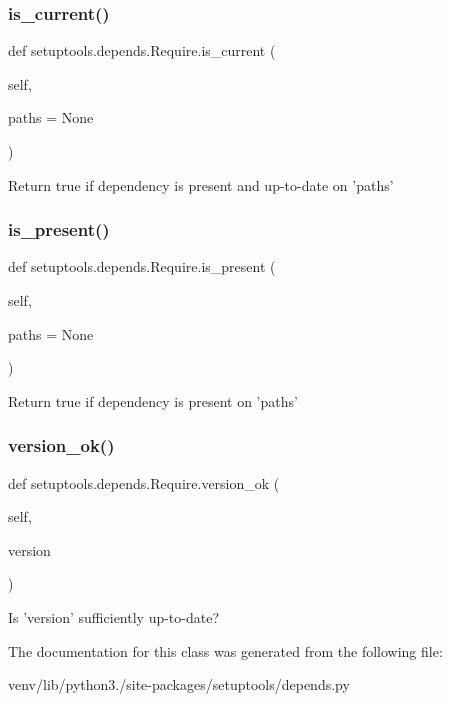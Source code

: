 \subsubsection{\texorpdfstring{is\+\_\+current()}{is\_current()}}
{\footnotesize\ttfamily def setuptools.\+depends.\+Require.\+is\+\_\+current (\begin{DoxyParamCaption}\item[{}]{self,  }\item[{}]{paths = {\ttfamily None} }\end{DoxyParamCaption})}

\begin{DoxyVerb}Return true if dependency is present and up-to-date on 'paths'\end{DoxyVerb}
 \mbox{\label{classsetuptools_1_1depends_1_1_require_a69771b02a8e6f6aee88cf1e9dfa0b6d4}} 
\subsubsection{\texorpdfstring{is\+\_\+present()}{is\_present()}}
{\footnotesize\ttfamily def setuptools.\+depends.\+Require.\+is\+\_\+present (\begin{DoxyParamCaption}\item[{}]{self,  }\item[{}]{paths = {\ttfamily None} }\end{DoxyParamCaption})}

\begin{DoxyVerb}Return true if dependency is present on 'paths'\end{DoxyVerb}
 \mbox{\label{classsetuptools_1_1depends_1_1_require_ae09a6a0a9d85091433a92026a2540e27}} 
\subsubsection{\texorpdfstring{version\+\_\+ok()}{version\_ok()}}
{\footnotesize\ttfamily def setuptools.\+depends.\+Require.\+version\+\_\+ok (\begin{DoxyParamCaption}\item[{}]{self,  }\item[{}]{version }\end{DoxyParamCaption})}

\begin{DoxyVerb}Is 'version' sufficiently up-to-date?\end{DoxyVerb}
 

The documentation for this class was generated from the following file\+:\begin{DoxyCompactItemize}
\item 
venv/lib/python3./site-\/packages/setuptools/depends.\+py\end{DoxyCompactItemize}
